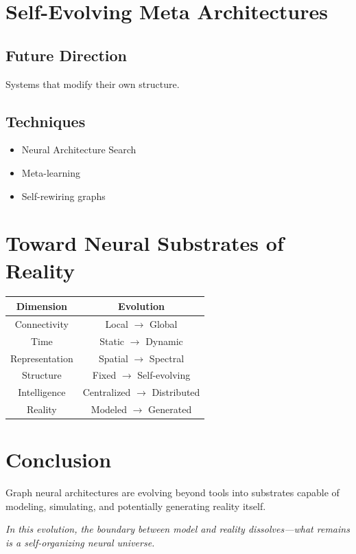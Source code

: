 \section{Self-Evolving Meta Architectures}

\subsection{Future Direction}
Systems that modify their own structure.

\subsection{Techniques}
\begin{itemize}
\item Neural Architecture Search
\item Meta-learning
\item Self-rewiring graphs
\end{itemize}

\section{Toward Neural Substrates of Reality}

\begin{tabular}{|c|c|}
\hline
Dimension & Evolution \\
\hline
Connectivity & Local $\rightarrow$ Global \\
Time & Static $\rightarrow$ Dynamic \\
Representation & Spatial $\rightarrow$ Spectral \\
Structure & Fixed $\rightarrow$ Self-evolving \\
Intelligence & Centralized $\rightarrow$ Distributed \\
Reality & Modeled $\rightarrow$ Generated \\
\hline
\end{tabular}

\section{Conclusion}
Graph neural architectures are evolving beyond tools into substrates capable of modeling, simulating, and potentially generating reality itself.

\textit{In this evolution, the boundary between model and reality dissolves—what remains is a self-organizing neural universe.}
